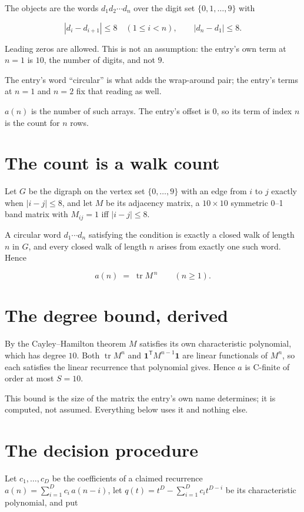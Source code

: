 \documentclass[11pt]{article}
\theoremstyle{definition}
\begin{document}
The objects are the words $d_1 d_2 \cdots d_n$ over the digit set $\{0,1,\dots,9\}$ with

\[|d_i - d_{i+1}| \le 8\quad (1 \le i < n), \qquad |d_n - d_1| \le 8.\]

Leading zeros are allowed. This is not an assumption: the entry's own term at $n=1$ is $10$, the number of digits, and not $9$.

The entry's word ``circular'' is what adds the wrap-around pair; the entry's terms at $n = 1$ and $n = 2$ fix that reading as well.

$a(n)$ is the number of such arrays. The entry's offset is 0, so its term of index $n$ is the count for $n$ rows.

\section{The count is a walk count}

Let $G$ be the digraph on the vertex set $\{0,\dots,9\}$ with an edge from $i$ to $j$ exactly when $|i-j| \le 8$, and let $M$ be its adjacency matrix, a $10 \times 10$ symmetric 0--1 band matrix with $M_{ij} = 1$ iff $|i-j| \le 8$.

A circular word $d_1\cdots d_n$ satisfying the condition is exactly a closed walk of length $n$ in $G$, and every closed walk of length $n$ arises from exactly one such word. Hence

\[a(n) \;=\; \operatorname{tr} M^{\,n} \qquad (n \ge 1).\]

\section{The degree bound, derived}

By the Cayley--Hamilton theorem $M$ satisfies its own characteristic polynomial, which has degree $10$. Both $\operatorname{tr} M^n$ and $\mathbf 1^{\mathsf T} M^{n-1} \mathbf 1$ are linear functionals of $M^{n}$, so each satisfies the linear recurrence that polynomial gives. Hence $a$ is C-finite of order at most $S = 10$.

This bound is the size of the matrix the entry's own name determines; it is computed, not assumed. Everything below uses it and nothing else.

\section{The decision procedure}

Let $c_1,\dots,c_D$ be the coefficients of a claimed recurrence $a(n) = \sum_{i=1}^{D} c_i\,a(n-i)$, let $q(t) = t^{D} - \sum_{i=1}^{D} c_i t^{D-i}$ be its characteristic polynomial, and put
\end{document}
